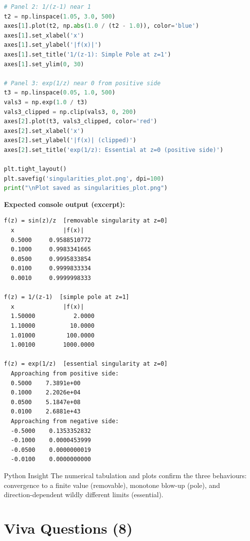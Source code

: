 \documentclass[12pt,a4paper]{article}
\begin{document}
\begin{lstlisting}[language=Python]
# Panel 2: 1/(z-1) near 1
t2 = np.linspace(1.05, 3.0, 500)
axes[1].plot(t2, np.abs(1.0 / (t2 - 1.0)), color='blue')
axes[1].set_xlabel('x')
axes[1].set_ylabel('|f(x)|')
axes[1].set_title('1/(z-1): Simple Pole at z=1')
axes[1].set_ylim(0, 30)

# Panel 3: exp(1/z) near 0 from positive side
t3 = np.linspace(0.05, 1.0, 500)
vals3 = np.exp(1.0 / t3)
vals3_clipped = np.clip(vals3, 0, 200)
axes[2].plot(t3, vals3_clipped, color='red')
axes[2].set_xlabel('x')
axes[2].set_ylabel('|f(x)| (clipped)')
axes[2].set_title('exp(1/z): Essential at z=0 (positive side)')

plt.tight_layout()
plt.savefig('singularities_plot.png', dpi=100)
print("\nPlot saved as singularities_plot.png")
\end{lstlisting}

\textbf{Expected console output (excerpt):}
\begin{verbatim}
f(z) = sin(z)/z  [removable singularity at z=0]
  x              |f(x)|
  0.5000     0.9588510772
  0.1000     0.9983341665
  0.0500     0.9995833854
  0.0100     0.9999833334
  0.0010     0.9999998333

f(z) = 1/(z-1)  [simple pole at z=1]
  x              |f(x)|
  1.50000           2.0000
  1.10000          10.0000
  1.01000         100.0000
  1.00100        1000.0000

f(z) = exp(1/z)  [essential singularity at z=0]
  Approaching from positive side:
  0.5000    7.3891e+00
  0.1000    2.2026e+04
  0.0500    5.1847e+08
  0.0100    2.6881e+43
  Approaching from negative side:
  -0.5000    0.1353352832
  -0.1000    0.0000453999
  -0.0500    0.0000000019
  -0.0100    0.0000000000
\end{verbatim}

\begin{learnbox}{Python Insight}
The numerical tabulation and plots confirm the three behaviours: convergence to a finite value
(removable), monotone blow-up (pole), and direction-dependent wildly different limits (essential).
\end{learnbox}

\section{Viva Questions (8)}
\end{document}
